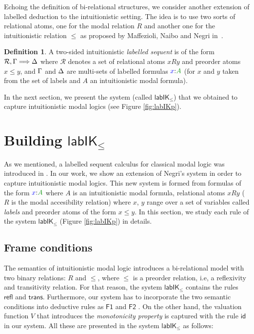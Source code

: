 \documentclass[a4paper]{article}
\theoremstyle{plain}
\theoremstyle{definition}
\newtheorem{definition}[theorem]{Definition}
\newcommand{\B}{\mathcal{R}}
\newcommand*{\lab}{\mathsf{lab}}
\newcommand*{\IK}{\mathsf{IK}}
\newcommand*{\labIKp}{\lab\IK_{\le}}
\newcommand*{\fm}[1]{{\color{notgreen}{#1}}}
\newcommand*{\lb}[1]{{\color{blue}{#1}}}
\newcommand*{\labels}[2]{\lb{#1}\mathord{:}\fm{#2}}
\newcommand{\SEQ}{\Longrightarrow}
\newcommand*{\rn}[1]  {\ensuremath{\mathsf{#1}}}
\newcommand*{\rel}{R}
\begin{document}
Echoing the definition of bi-relational structures, we consider another extension of labelled deduction to the intuitionistic setting. 
%
The idea is to use two sorts of relational atoms, one for the modal relation $\rel$ and another one for the intuitionistic relation $\leq$ as proposed by Maffezioli, Naibo and Negri in~\cite{maffezioli:etal:synthese13}. 
%

\begin{definition}
A two-sided intuitionistic \emph{labelled sequent} is of the form $\B, \Left \SEQ \Right$ where $\B$ denotes a set of relational atoms $x \rel y$ and preorder atoms $x \le y$, and $\Gamma$ and $\Delta$ are multi-sets of labelled formulas $\labels{x}{A}$ (for $x$ and $y$ taken from the set of labels and $A$ an intuitionistic modal formula).
\end{definition}
In the next section, we present the system (called $\labIKp$) that we obtained to capture intuitionistic modal logics (see Figure \ref{fig:labIKp}).

\section{Building $\labIKp$}

As we mentioned, a labelled sequent calculus for classical modal logic was introduced in \cite{negri:jpl2005}. In our work, we show an extension of Negri's system in order to capture intuitionistic modal logics. This new system is formed from formulas of the form $\labels{x}{A}$ where $A$ is an intuitionistic modal formula, relational atoms $xRy$ ($R$ is the modal accesibility relation) where $x$, $y$ range over a set of variables called \emph{labels} and preorder atoms of the form $x \le y$. In this section, we study each rule of the system $\labIKp$ (Figure \ref{fig:labIKp}) in details. 

\subsection{Frame conditions}
The semantics of intuitionistic modal logic introduces a bi-relational model with two binary relations: $R$ and $\le$, where $\le$ is a preorder relation, i.e, a reflexivity and transitivity relation. For that reason, the system $\labIKp$ contains the rules $\rn{refl}$ and $\rn{trans}$. Furthermore, our system has to incorporate the two semantic conditions into deductive rules as $\rn{F1}$ and $\rn{F2}$ . On the other hand, the valuation function $V$ that introduces the \emph{monotonicity property} is captured with the rule $\rn{id}$ in our system. All these are presented in the system $\labIKp$ as follows:
\end{document}
